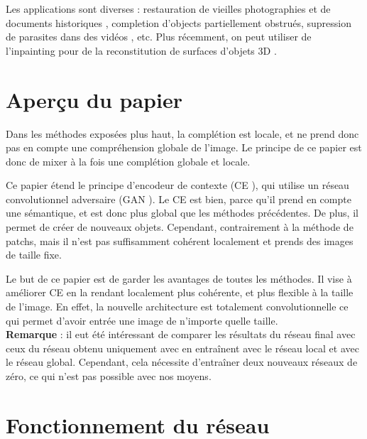 \documentclass[12pt]{article}
\begin{document}
Les applications sont diverses : restauration de vieilles photographies et de documents historiques \cite{bertalmio2000}, completion d'objects partiellement obstrués, supression de parasites dans des vidéos \cite{wexler2007}, etc. Plus récemment, on peut utiliser de l'inpainting pour de la reconstitution de surfaces d'objets 3D \cite{bobenko2005} \cite{harary2014}.

\section{Aperçu du papier}

Dans les méthodes exposées plus haut, la complétion est locale, et ne prend donc pas en compte une compréhension globale de l'image. Le principe de ce papier est donc de mixer à la fois une complétion globale et locale.

Ce papier étend le principe d'encodeur de contexte (CE \cite{pathak2016}), qui utilise un réseau convolutionnel adversaire (GAN \cite{goodfellow2014}). Le CE est bien, parce qu'il prend en compte une sémantique, et est donc plus global que les méthodes précédentes. De plus, il permet de créer de nouveaux objets. Cependant, contrairement à la méthode de patchs, mais il n'est pas suffisamment cohérent localement et prends des images de taille fixe.

Le but de ce papier est de garder les avantages de toutes les
méthodes. Il vise à améliorer CE en la rendant localement plus
cohérente, et plus flexible à la taille de l'image. En effet, la
nouvelle architecture est totalement convolutionnelle ce qui permet
d'avoir entrée une image de n'importe quelle taille. \\


\textbf{Remarque} : il eut été intéressant de comparer les résultats du réseau final avec ceux du réseau obtenu uniquement avec en entraînent avec le réseau local et avec le réseau global. Cependant, cela nécessite d'entraîner deux nouveaux réseaux de zéro, ce qui n'est pas possible avec nos moyens.

\section{Fonctionnement du réseau}
\end{document}

